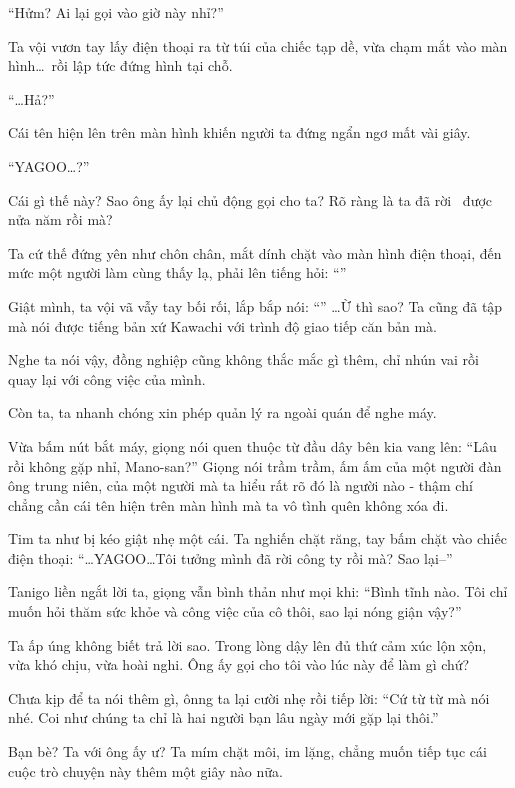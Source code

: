 \documentclass[../main.tex]{subfiles}
\begin{document}
``Hửm? Ai lại gọi vào giờ này nhỉ?''

Ta vội vươn tay lấy điện thoại ra từ túi của chiếc tạp dề, vừa chạm mắt vào màn hình\dots\ rồi lập tức đứng hình tại chỗ.

``\dots Hả?''

Cái tên hiện lên trên màn hình khiến người ta đứng ngẩn ngơ mất vài giây.

``YAGOO\dots?''

Cái gì thế này? Sao ông ấy lại chủ động gọi cho ta? Rõ ràng là ta đã rời \hll\ được nửa năm rồi mà?

Ta cứ thế đứng yên như chôn chân, mắt dính chặt vào màn hình điện thoại, đến mức một người làm cùng thấy lạ, phải lên tiếng hỏi: ``''

Giật mình, ta vội vã vẫy tay bối rối, lắp bắp nói: ``'' \dots Ừ thì sao? Ta cũng đã tập mà nói được tiếng bản xứ Kawachi với trình độ giao tiếp căn bản mà.

Nghe ta nói vậy, đồng nghiệp cũng không thắc mắc gì thêm, chỉ nhún vai rồi quay lại với công việc của mình.

Còn ta, ta nhanh chóng xin phép quản lý ra ngoài quán để nghe máy.

Vừa bấm nút bắt máy, giọng nói quen thuộc từ đầu dây bên kia vang lên: ``Lâu rồi không gặp nhỉ, Mano-san?'' Giọng nói trầm trầm, ấm ấm của một người đàn ông trung niên, của một người mà ta hiểu rất rõ đó là người nào - thậm chí chẳng cần cái tên hiện trên màn hình mà ta vô tình quên không xóa đi.

Tim ta như bị kéo giật nhẹ một cái. Ta nghiến chặt răng, tay bấm chặt vào chiếc điện thoại: ``\dots YAGOO\dots Tôi tưởng mình đã rời công ty rồi mà? Sao lại--''

Tanigo liền ngắt lời ta, giọng vẫn bình thản như mọi khi: ``Bình tĩnh nào. Tôi chỉ muốn hỏi thăm sức khỏe và công việc của cô thôi, sao lại nóng giận vậy?''

Ta ấp úng không biết trả lời sao. Trong lòng dậy lên đủ thứ cảm xúc lộn xộn, vừa khó chịu, vừa hoài nghi. Ông ấy gọi cho tôi vào lúc này để làm gì chứ?

Chưa kịp để ta nói thêm gì, ônng ta lại cười nhẹ rồi tiếp lời: ``Cứ từ từ mà nói nhé. Coi như chúng ta chỉ là hai người bạn lâu ngày mới gặp lại thôi.''

Bạn bè? Ta với ông ấy ư? Ta mím chặt môi, im lặng, chẳng muốn tiếp tục cái cuộc trò chuyện này thêm một giây nào nữa.
\end{document}
